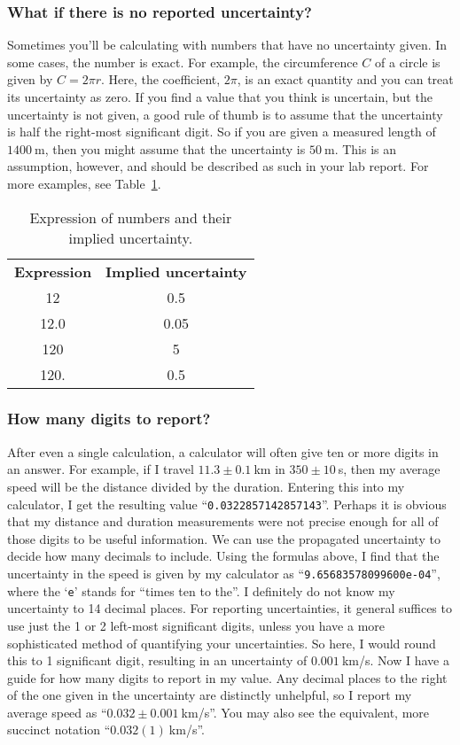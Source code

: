 \subsubsection{What if there is no reported uncertainty?}

Sometimes you'll be calculating with numbers that have no uncertainty given.
In some cases, the number is exact.
For example, the circumference $C$ of a circle is given by $C = 2 \pi r$. Here, the coefficient, $2\pi$, is an exact quantity and you can treat its uncertainty as zero.
If you find a value that you think is uncertain, but the uncertainty is not given, a good rule of thumb is to assume that the uncertainty is half the right-most significant digit.
So if you are given a measured length of $1400\:$m, then you might assume that the uncertainty is $50\:$m.
This is an assumption, however, and should be described as such in your lab report.
For more examples, see Table~\ref{unc:tab:implied}.

\begin{table}
	\begin{center}
		\begin{tabular}{cc}
			\textbf{Expression} & \textbf{Implied uncertainty} \\
			12 & 0.5 \\
			12.0 & 0.05 \\
			120 & 5 \\
			120. & 0.5
		\end{tabular}
		\caption{Expression of numbers and their implied uncertainty.}\label{unc:tab:implied}
	\end{center}
\end{table}

\subsubsection{How many digits to report?}

After even a single calculation, a calculator will often give ten or more digits in an answer.
For example, if I travel $11.3 \pm 0.1\:$km in $350 \pm 10\:$s, then my average speed will be the distance divided by the duration. Entering this into my calculator, I get the resulting value ``\texttt{0.0322857142857143}''.
Perhaps it is obvious that my distance and duration measurements were not precise enough for all of those digits to be useful information.
We can use the propagated uncertainty to decide how many decimals to include.
Using the formulas above, I find that the uncertainty in the speed is given by my calculator as ``\texttt{9.65683578099600e-04}'', where the `\texttt{e}' stands for ``times ten to the''.
I definitely do not know my uncertainty to 14 decimal places.
For reporting uncertainties, it general suffices to use just the 1 or 2 left-most significant digits, unless you have a more sophisticated method of quantifying your uncertainties.
So here, I would round this to 1 significant digit, resulting in an uncertainty of $0.001\:$km/s.
Now I have a guide for how many digits to report in my value.
Any decimal places to the right of the one given in the uncertainty are distinctly unhelpful, so I report my average speed as ``$0.032 \pm 0.001\:$km/s''.
You may also see the equivalent, more succinct notation ``$0.032(1)\:$km/s''.

